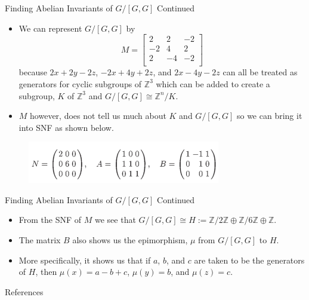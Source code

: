 \documentclass{beamer}
\begin{document}
\begin{frame}{Finding Abelian Invariants of $G/[G, G]$ Continued}
    \begin{itemize}
        \item We can represent $G/[G, G]$ by$$
        M = \begin{bmatrix}
            2 & 2 & -2\\
            -2 & 4 & 2\\
            2 & -4 & -2\\
        \end{bmatrix}
        $$ because $2x + 2y - 2z$, $-2x + 4y + 2z$, and $2x - 4y - 2z$ can all be treated as generators for cyclic subgroups of $\mathbb{Z}^3$ which can be added to create a subgroup, $K$ of $\mathbb{Z}^3$ and $G/[G, G] \cong \mathbb{Z}^n/K$.
        \item $M$ however, does not tell us much about $K$ and $G/[G, G]$ so we can bring it into SNF as shown below.
    \end{itemize}
    \begin{figure}
        \centering
        \includegraphics[width=0.75\textwidth]{SNF.png}
    \end{figure}
\end{frame}
\begin{frame}{Finding Abelian Invariants of $G/[G, G]$ Continued}
    \begin{itemize}
        \item From the SNF of $M$ we see that $G/[G, G] \cong H :=\mathbb{Z}/2\mathbb{Z} \oplus \mathbb{Z}/6\mathbb{Z} \oplus \mathbb{Z}$.
        \item The matrix $B$ also shows us the epimorphism, $\mu$ from $G/[G, G]$ to $H$.
        \item More specifically, it shows us that if $a$, $b$, and $c$ are taken to be the generators of $H$, then $\mu(x) = a - b + c$, $\mu(y) = b$, and $\mu(z) = c$.
    \end{itemize}
\end{frame}
\begin{frame}{References}
    
    
\end{frame}
\end{document}
